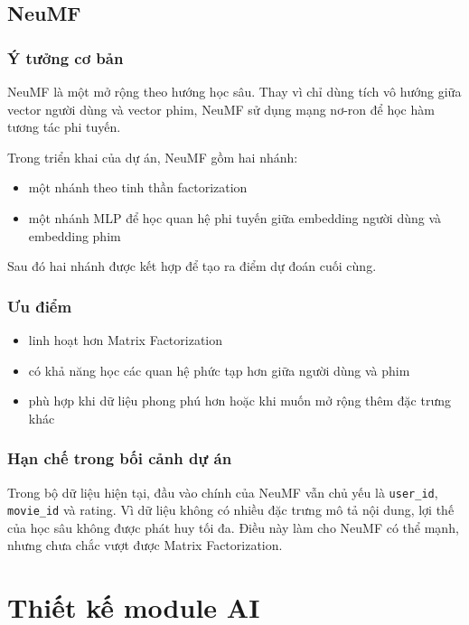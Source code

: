\documentclass[12pt,a4paper]{article}
\begin{document}
\subsection{NeuMF}

\subsubsection{Ý tưởng cơ bản}

NeuMF là một mở rộng theo hướng học sâu. Thay vì chỉ dùng tích vô hướng giữa vector người dùng và vector phim, NeuMF sử dụng mạng nơ-ron để học hàm tương tác phi tuyến.

Trong triển khai của dự án, NeuMF gồm hai nhánh:

\begin{itemize}[leftmargin=1.5cm]
    \item một nhánh theo tinh thần factorization
    \item một nhánh MLP để học quan hệ phi tuyến giữa embedding người dùng và embedding phim
\end{itemize}

Sau đó hai nhánh được kết hợp để tạo ra điểm dự đoán cuối cùng.

\subsubsection{Ưu điểm}

\begin{itemize}[leftmargin=1.5cm]
    \item linh hoạt hơn Matrix Factorization
    \item có khả năng học các quan hệ phức tạp hơn giữa người dùng và phim
    \item phù hợp khi dữ liệu phong phú hơn hoặc khi muốn mở rộng thêm đặc trưng khác
\end{itemize}

\subsubsection{Hạn chế trong bối cảnh dự án}

Trong bộ dữ liệu hiện tại, đầu vào chính của NeuMF vẫn chủ yếu là \texttt{user\_id}, \texttt{movie\_id} và rating. Vì dữ liệu không có nhiều đặc trưng mô tả nội dung, lợi thế của học sâu không được phát huy tối đa. Điều này làm cho NeuMF có thể mạnh, nhưng chưa chắc vượt được Matrix Factorization.

\section{Thiết kế module AI}
\end{document}
